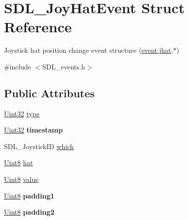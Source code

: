 \hypertarget{struct_s_d_l___joy_hat_event}{}\section{S\+D\+L\+\_\+\+Joy\+Hat\+Event Struct Reference}
\label{struct_s_d_l___joy_hat_event}


Joystick hat position change event structure (\hyperlink{union_s_d_l___event_a421b40e0f8e01f181c8d5548cff1dd1d}{event.\+jhat}.$\ast$)  




{\ttfamily \#include $<$S\+D\+L\+\_\+events.\+h$>$}

\subsection*{Public Attributes}
\begin{DoxyCompactItemize}
\item 
\hyperlink{_s_d_l__stdinc_8h_add440eff171ea5f55cb00c4a9ab8672d}{Uint32} \hyperlink{struct_s_d_l___joy_hat_event_ac583dafab46c44354e210a542aff57cc}{type}
\item 
\hypertarget{struct_s_d_l___joy_hat_event_ade58ecb3e75aad4ef9809f040519a021}{}\hyperlink{_s_d_l__stdinc_8h_add440eff171ea5f55cb00c4a9ab8672d}{Uint32} {\bfseries timestamp}\label{struct_s_d_l___joy_hat_event_ade58ecb3e75aad4ef9809f040519a021}

\item 
S\+D\+L\+\_\+\+Joystick\+I\+D \hyperlink{struct_s_d_l___joy_hat_event_ac9d9bb179f9116d16b3da47cacd74b55}{which}
\item 
\hyperlink{_s_d_l__stdinc_8h_a2944638813a090aa23e62f4da842c3e2}{Uint8} \hyperlink{struct_s_d_l___joy_hat_event_ab1b54a6d1091e583e856f86b5af1e2f6}{hat}
\item 
\hyperlink{_s_d_l__stdinc_8h_a2944638813a090aa23e62f4da842c3e2}{Uint8} \hyperlink{struct_s_d_l___joy_hat_event_a52b179a34407449941b61d988ca72ef4}{value}
\item 
\hypertarget{struct_s_d_l___joy_hat_event_afbe72b6702cf7f70ccbe206737ab2e49}{}\hyperlink{_s_d_l__stdinc_8h_a2944638813a090aa23e62f4da842c3e2}{Uint8} {\bfseries padding1}\label{struct_s_d_l___joy_hat_event_afbe72b6702cf7f70ccbe206737ab2e49}

\item 
\hypertarget{struct_s_d_l___joy_hat_event_adaca3e99773130ae456690ba83feb420}{}\hyperlink{_s_d_l__stdinc_8h_a2944638813a090aa23e62f4da842c3e2}{Uint8} {\bfseries padding2}\label{struct_s_d_l___joy_hat_event_adaca3e99773130ae456690ba83feb420}

\end{DoxyCompactItemize}


